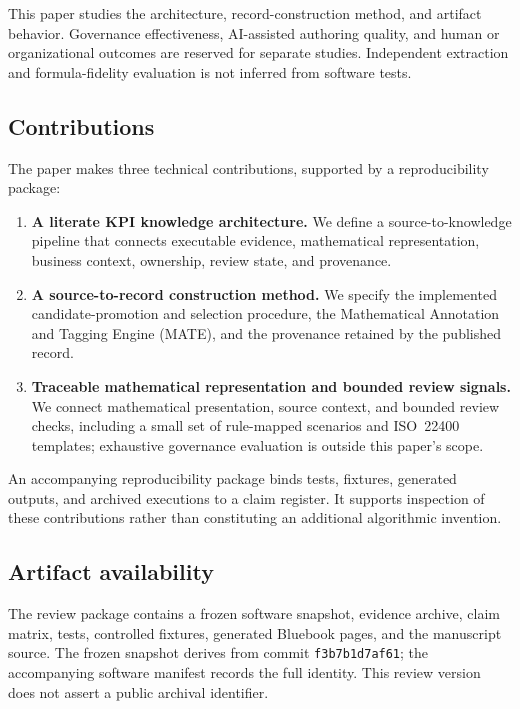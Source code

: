 \documentclass[a4paper,fleqn]{cas-dc}
\begin{document}
This paper studies the architecture, record-construction method, and artifact behavior. Governance effectiveness, AI-assisted authoring quality, and human or organizational outcomes are reserved for separate studies. Independent extraction and formula-fidelity evaluation is not inferred from software tests.

\subsection{Contributions}

The paper makes three technical contributions, supported by a reproducibility package:

\begin{enumerate}[leftmargin=*]
  \item \textbf{A literate KPI knowledge architecture.} We define a source-to-knowledge pipeline that connects executable evidence, mathematical representation, business context, ownership, review state, and provenance.
  \item \textbf{A source-to-record construction method.} We specify the implemented candidate-promotion and selection procedure, the Mathematical Annotation and Tagging Engine (MATE), and the provenance retained by the published record.
  \item \textbf{Traceable mathematical representation and bounded review signals.} We connect mathematical presentation, source context, and bounded review checks, including a small set of rule-mapped scenarios and ISO~22400 templates; exhaustive governance evaluation is outside this paper's scope.
\end{enumerate}

An accompanying reproducibility package binds tests, fixtures, generated outputs, and archived executions to a claim register. It supports inspection of these contributions rather than constituting an additional algorithmic invention.

\subsection{Artifact availability}

The review package contains a frozen software snapshot, evidence archive, claim matrix, tests, controlled fixtures, generated Bluebook pages, and the manuscript source. The frozen snapshot derives from commit \texttt{f3b7b1d7af61}; the accompanying software manifest records the full identity. This review version does not assert a public archival identifier.
\end{document}
